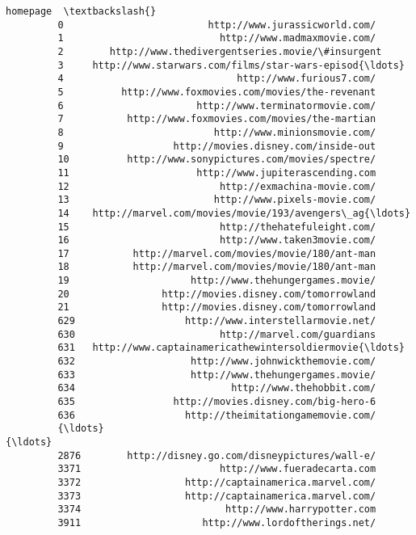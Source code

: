 \documentclass[11pt]{article}
\begin{document}
\begin{Verbatim}[commandchars=\\\{\}]
                                                        homepage  \textbackslash{}
         0                         http://www.jurassicworld.com/   
         1                           http://www.madmaxmovie.com/   
         2        http://www.thedivergentseries.movie/\#insurgent   
         3     http://www.starwars.com/films/star-wars-episod{\ldots}   
         4                              http://www.furious7.com/   
         5          http://www.foxmovies.com/movies/the-revenant   
         6                       http://www.terminatormovie.com/   
         7           http://www.foxmovies.com/movies/the-martian   
         8                          http://www.minionsmovie.com/   
         9                   http://movies.disney.com/inside-out   
         10          http://www.sonypictures.com/movies/spectre/   
         11                      http://www.jupiterascending.com   
         12                          http://exmachina-movie.com/   
         13                         http://www.pixels-movie.com/   
         14    http://marvel.com/movies/movie/193/avengers\_ag{\ldots}   
         15                          http://thehatefuleight.com/   
         16                          http://www.taken3movie.com/   
         17           http://marvel.com/movies/movie/180/ant-man   
         18           http://marvel.com/movies/movie/180/ant-man   
         19                     http://www.thehungergames.movie/   
         20                http://movies.disney.com/tomorrowland   
         21                http://movies.disney.com/tomorrowland   
         629                   http://www.interstellarmovie.net/   
         630                         http://marvel.com/guardians   
         631   http://www.captainamericathewintersoldiermovie{\ldots}   
         632                    http://www.johnwickthemovie.com/   
         633                    http://www.thehungergames.movie/   
         634                           http://www.thehobbit.com/   
         635                 http://movies.disney.com/big-hero-6   
         636                   http://theimitationgamemovie.com/   
         {\ldots}                                                 {\ldots}   
         2876        http://disney.go.com/disneypictures/wall-e/   
         3371                        http://www.fueradecarta.com   
         3372                  http://captainamerica.marvel.com/   
         3373                  http://captainamerica.marvel.com/   
         3374                         http://www.harrypotter.com   
         3911                     http://www.lordoftherings.net/   

\end{Verbatim}
\end{document}
